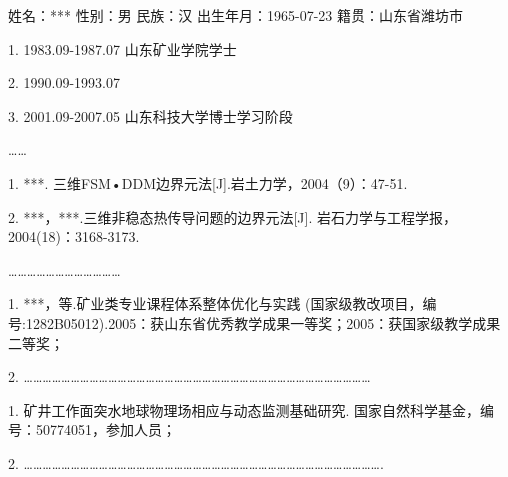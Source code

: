
\newpage\thispagestyle{empty}
\begin{center}{\bfseries\xiaoer{}}\end{center}
\vspace{1em}
\begin{raggedright}{\bfseries\sihao{}}\end{raggedright}
 
 
姓名：*** 性别：男 民族：汉 出生年月：1965-07-23 籍贯：山东省潍坊市

1. 1983.09-1987.07   山东矿业学院学士

2. 1990.09-1993.07   

3. 2001.09-2007.05   山东科技大学博士学习阶段

……


\begin{raggedright}{\bfseries\sihao{}}\end{raggedright}

1.  ***. 三维FSM•DDM边界元法[J].岩土力学，2004（9）：47-51.

2.  ***，***.三维非稳态热传导问题的边界元法[J]. 岩石力学与工程学报，2004(18)：3168-3173.

………………………………


\begin{raggedright}{\bfseries\sihao{}}\end{raggedright}

1.  ***，等.矿业类专业课程体系整体优化与实践 (国家级教改项目，编号:1282B05012).2005：获山东省优秀教学成果一等奖；2005：获国家级教学成果二等奖；

2.  …………………………………………………………………………………………………


\begin{raggedright}{\bfseries\sihao{}}\end{raggedright}

1.  矿井工作面突水地球物理场相应与动态监测基础研究. 国家自然科学基金，编号：50774051，参加人员；

2.  …………………………………………………………………………………………………….

\clearpage


